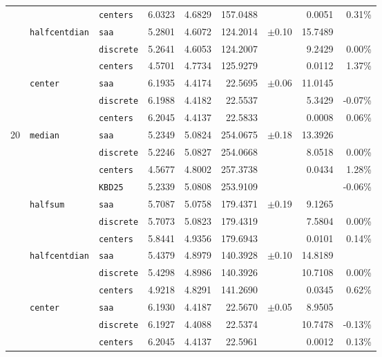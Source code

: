 \documentclass[letter,11pt, reqno]{amsart}
\renewcommand{\;}{\quad}
\theoremstyle{thmstyleone}%
\theoremstyle{thmstyletwo}%
\theoremstyle{thmstylethree}%
\begin{document}
\begin{table}[h!]
\begin{adjustbox}{width=0.65\textwidth}
\begin{tabular}{@{} c l l c c r l r r @{}}
 & & \texttt{centers}  & 6.0323 & 4.6829 & 157.0488& {}        & 0.0051  & 0.31\% \\[2pt]
 & {\texttt{halfcentdian}}
   & \texttt{saa}      & 5.2801 & 4.6072 & 124.2014& $\pm$0.10 & 15.7489 & {} \\
 & & \texttt{discrete} & 5.2641 & 4.6053 & 124.2007& {}        & 9.2429  & 0.00\% \\
 & & \texttt{centers}  & 4.5701 & 4.7734 & 125.9279& {}        & 0.0112  & 1.37\% \\[2pt]
 & {\texttt{center}}
   & \texttt{saa}      & 6.1935 & 4.4174 & 22.5695 & $\pm$0.06 & 11.0145 & {} \\
 & & \texttt{discrete} & 6.1988 & 4.4182 & 22.5537 & {}        & 5.3429  & -0.07\% \\
 & & \texttt{centers}  & 6.2045 & 4.4137 & 22.5833 & {}        & 0.0008  & 0.06\% \\
\midrule
{20}
 & {\texttt{median}}
   & \texttt{saa}      & 5.2349 & 5.0824 & 254.0675& $\pm$0.18 & 13.3926 & {} \\
 & & \texttt{discrete} & 5.2246 & 5.0827 & 254.0668& {}        & 8.0518  & 0.00\% \\
 & & \texttt{centers}  & 4.5677 & 4.8002 & 257.3738& {}        & 0.0434  & 1.28\% \\
 & & \texttt{KBD25}    & 5.2339 & 5.0808 & 253.9109& {}        & {}      & -0.06\% \\[2pt]
 & {\texttt{halfsum}}
   & \texttt{saa}      & 5.7087 & 5.0758 & 179.4371& $\pm$0.19 & 9.1265  & {} \\
 & & \texttt{discrete} & 5.7073 & 5.0823 & 179.4319& {}        & 7.5804  & 0.00\% \\
 & & \texttt{centers}  & 5.8441 & 4.9356 & 179.6943& {}        & 0.0101  & 0.14\% \\[2pt]
 & {\texttt{halfcentdian}}
   & \texttt{saa}      & 5.4379 & 4.8979 & 140.3928& $\pm$0.10 & 14.8189 & {} \\
 & & \texttt{discrete} & 5.4298 & 4.8986 & 140.3926& {}        & 10.7108 & 0.00\% \\
 & & \texttt{centers}  & 4.9218 & 4.8291 & 141.2690& {}        & 0.0345  & 0.62\% \\[2pt]
 & {\texttt{center}}
   & \texttt{saa}      & 6.1930 & 4.4187 & 22.5670 & $\pm$0.05 & 8.9505  & {} \\
 & & \texttt{discrete} & 6.1927 & 4.4088 & 22.5374 & {}        & 10.7478 & -0.13\% \\
 & & \texttt{centers}  & 6.2045 & 4.4137 & 22.5961 & {}        & 0.0012  & 0.13\% \\

\end{tabular}
\end{adjustbox}
\end{table}
\end{document}
